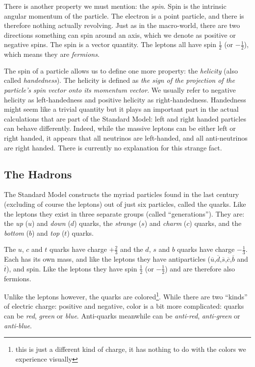 There is another property we must mention: the \textit{spin}. Spin is the intrinsic angular momentum of the particle. The electron is a point particle, and there is therefore nothing actually revolving. Just as in the macro-world, there are two directions something can spin around an axis, which we denote as positive or negative spins. The spin is a vector quantity. The leptons all have spin $\frac{1}{2}$ (or $-\frac{1}{2}$), which means they are \textit{fermions}. 

The spin of a particle allows us to define one more property: the \textit{helicity} (also called \textit{handedness}). The helicity is defined as \textit{the sign of the projection of the particle's spin vector onto its momentum vector}. We usually refer to negative helicity as left-handedness and positive helicity as right-handedness. Handedness might seem like a trivial quantity but it plays an important part in the actual calculations that are part of the Standard Model: left and right handed particles can behave differently. Indeed, while the massive leptons can be either left or right handed, it appears that all neutrinos are left-handed, and all anti-neutrinos are right handed. There is currently no explanation for this strange fact.

\subsection{The Hadrons}
The Standard Model constructs the myriad particles found in the last century (excluding of course the leptons) out of just six particles, called the quarks. Like the leptons they exist in three separate groups (called ``generations''). They are: the \textit{up} ($u$) and \textit{down} ($d$) quarks, the \textit{strange} ($s$) and \textit{charm} ($c$) quarks, and the \textit{bottom} ($b$) and \textit{top} ($t$) quarks.

The $u$, $c$ and $t$ quarks have charge $+\frac{2}{3}$ and the $d$, $s$ and $b$ quarks have charge $-\frac{1}{3}$. Each has its own mass, and like the leptons they have antiparticles ($\overline{u}$,$\overline{d}$,$\overline{s}$,$\overline{c}$,$\overline{b}$ and $\overline{t}$), and spin. Like the leptons they have spin  $\frac{1}{2}$ (or $-\frac{1}{2}$) and are therefore also fermions.

Unlike the leptons however, the quarks are colored\footnote{this is just a different kind of charge, it has nothing to do with the colors we experience visually}. While there are two ``kinds'' of electric charge: positive and negative, color is a bit more complicated: quarks can be \textit{red}, \textit{green} or \textit{blue}. Anti-quarks meanwhile can be \textit{anti-red}, \textit{anti-green} or \textit{anti-blue}.


